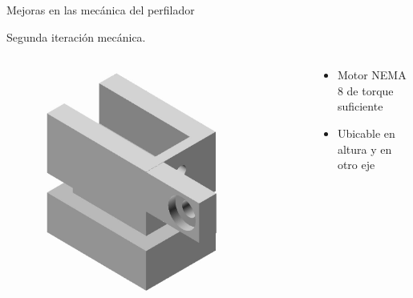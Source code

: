 \begin{frame}{Mejoras en las mecánica del perfilador}
\begin{onlyenv}
    Segunda iteración mecánica.
    \begin{columns}[c]
        \begin{column}{0.4\textwidth}
            \begin{figure}
                \centering
                \includegraphics[width=0.8\textwidth]{fig/perfilador/soporte_labo7_2}
             
                \label{fig:soporte_labo7}
            \end{figure}
        \end{column}
        \begin{column}{0.5\textwidth}
            \begin{itemize}
                \item  Motor NEMA 8 de torque suficiente
                \item  Ubicable en altura y en otro eje
            \end{itemize}
            
        \end{column}
    \end{columns}
    \end{onlyenv}
\end{frame}

